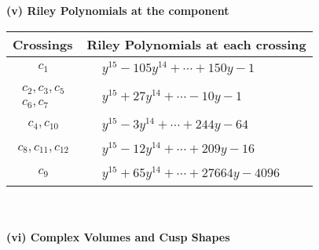 \documentclass[1p]{elsarticle_modified}
\theoremstyle{definition}
\begin{document}
\newpage\renewcommand{\arraystretch}{1}
\flushleft \textbf{(v) Riley Polynomials at the component}\newline \\
\begin{tabular}{m{50pt}|m{274pt}}
Crossings & \hspace{64pt}Riley Polynomials at each crossing \\
\hline $$\begin{aligned}c_{1}\end{aligned}$$&$\begin{aligned}
&y^{15}-105 y^{14}+\cdots+150 y-1
\end{aligned}$\\
\hline $$\begin{aligned}c_{2},c_{3},c_{5}\\c_{6},c_{7}\end{aligned}$$&$\begin{aligned}
&y^{15}+27 y^{14}+\cdots-10 y-1
\end{aligned}$\\
\hline $$\begin{aligned}c_{4},c_{10}\end{aligned}$$&$\begin{aligned}
&y^{15}-3 y^{14}+\cdots+244 y-64
\end{aligned}$\\
\hline $$\begin{aligned}c_{8},c_{11},c_{12}\end{aligned}$$&$\begin{aligned}
&y^{15}-12 y^{14}+\cdots+209 y-16
\end{aligned}$\\
\hline $$\begin{aligned}c_{9}\end{aligned}$$&$\begin{aligned}
&y^{15}+65 y^{14}+\cdots+27664 y-4096
\end{aligned}$\\
\hline
\end{tabular}\\~\\
\newpage\flushleft \textbf{(vi) Complex Volumes and Cusp Shapes}
\end{document}

